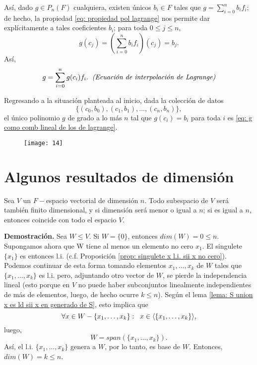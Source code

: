 Así, dado $g \in P_{n}(F)$ cualquiera, existen únicos
$b_{i} \in F$ tales que $g = \sum_{i = 0}^{n}b_{i}f_{i}$;
de hecho, la propiedad \eqref{eq: propiedad pol lagrange}
nos permite dar explícitamente a tales coeficientes $b_{i}$;
para toda $0 \leq j \leq n$,
\[
g(c_{j}) = \left( \sum_{i = 0}^{n}b_{i}f_{i} \right)(c_{j})
= b_{j}.
\]
Así,
\begin{equation}
	\label{eq: g como comb lineal de los de lagrange}
	g = \sum_{i=0}^{n}g(c_{i})f_{i}.
	\hspace{0.2cm} \textit{(Ecuación de interpolación de Lagrange)}
\end{equation}


Regresando a la situación planteada al inicio,
dada la colección de datos 
$$\{ (c_{0}, b_{0}), (c_{1}, b_{1}), \ldots , (c_{n}, b_{n}) \},$$
el único polinomio $g$ de grado a lo más $n$ tal que
$g(c_{i}) = b_{i}$ para toda $i$ es 
\eqref{eq: g como comb lineal de los de lagrange}.

\begin{figure}[H]
	\centering
	\texttt{[image: 14]} 
\end{figure}	




\section{Algunos resultados de dimensión}

\begin{teo}
	\label{teo: la dim de subespacios es menor o igual a la del espacio}
Sea $V$ un $F-$espacio vectorial de dimensión $n$.
Todo subespacio de $V$ será también finito dimensional, y
si dimensión será menor o igual a $n$; si es igual a $n$,
entonces coincide con todo el espacio $V$.
\end{teo}
\noindent
\textbf{Demostración.}
Sea $W \leq V$.
Si $W = \{ 0 \}$, entonces $dim(W) = 0 \leq n$. Supongamos ahora
que W tiene al menos un elemento no cero $x_{1}$.
El singulete
$\{ x_{1} \}$ es entonces l.i.
(c.f. Proposición \ref{prop: singulete x l.i. sii x no cero}).
Podemos continuar de esta forma tomando elementos
$x_{1}, \ldots, x_{k}$ de $W$
tales que $\{ x_{1}, \ldots , x_{k} \}$ es l.i.
pero, adjuntando otro vector de $W$, se pierde la independencia
lineal (esto porque en $V$ no puede haber subconjuntos linealmente
independientes de más de elementos, luego, de hecho
ocurre $k \leq n$).
Según el lema 
\ref{lema: S union x es ld sii x en generado de S}, esto implica
que
\[
\forall x \in W - \{ x_{1}, \ldots , x_{k} \}:
\hspace{0.2cm} x \in \langle \{ x_{1}, \ldots , x_{k} \} \rangle,
\]
luego, 
\[
W = span(\{ x_{1}, \ldots , x_{k} \}).
\]
Así, el l.i. $\{ x_{1}, \ldots , x_{k} \}$
genera a $W$, por lo tanto, es base de $W$.
Entonces, $dim (W) = k \leq n$.

